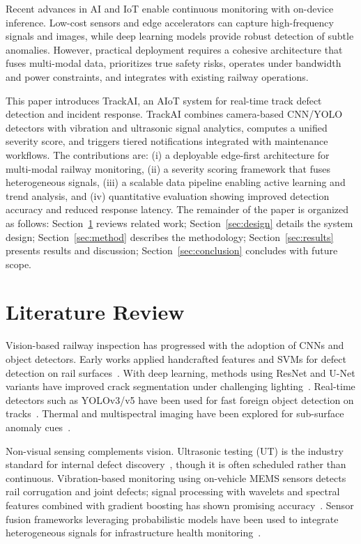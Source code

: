 \documentclass[conference]{IEEEtran}
\begin{document}
Recent advances in AI and IoT enable continuous monitoring with on-device inference. Low-cost sensors and edge accelerators can capture high-frequency signals and images, while deep learning models provide robust detection of subtle anomalies. However, practical deployment requires a cohesive architecture that fuses multi-modal data, prioritizes true safety risks, operates under bandwidth and power constraints, and integrates with existing railway operations.

This paper introduces TrackAI, an AIoT system for real-time track defect detection and incident response. TrackAI combines camera-based CNN/YOLO detectors with vibration and ultrasonic signal analytics, computes a unified severity score, and triggers tiered notifications integrated with maintenance workflows. The contributions are: (i) a deployable edge-first architecture for multi-modal railway monitoring, (ii) a severity scoring framework that fuses heterogeneous signals, (iii) a scalable data pipeline enabling active learning and trend analysis, and (iv) quantitative evaluation showing improved detection accuracy and reduced response latency. The remainder of the paper is organized as follows: Section~\ref{sec:lit} reviews related work; Section~\ref{sec:design} details the system design; Section~\ref{sec:method} describes the methodology; Section~\ref{sec:results} presents results and discussion; Section~\ref{sec:conclusion} concludes with future scope.

\section{Literature Review}
\label{sec:lit}
Vision-based railway inspection has progressed with the adoption of CNNs and object detectors. Early works applied handcrafted features and SVMs for defect detection on rail surfaces~\cite{gibert2015survey}. With deep learning, methods using ResNet and U-Net variants have improved crack segmentation under challenging lighting~\cite{zhang2019crack}. Real-time detectors such as YOLOv3/v5 have been used for fast foreign object detection on tracks~\cite{islam2020yolo}. Thermal and multispectral imaging have been explored for sub-surface anomaly cues~\cite{kumar2020multispectral}.

Non-visual sensing complements vision. Ultrasonic testing (UT) is the industry standard for internal defect discovery~\cite{clark2017ultrasonic}, though it is often scheduled rather than continuous. Vibration-based monitoring using on-vehicle MEMS sensors detects rail corrugation and joint defects; signal processing with wavelets and spectral features combined with gradient boosting has shown promising accuracy~\cite{bureika2013vibration}. Sensor fusion frameworks leveraging probabilistic models have been used to integrate heterogeneous signals for infrastructure health monitoring~\cite{dascoli2020fusion}.
\end{document}
